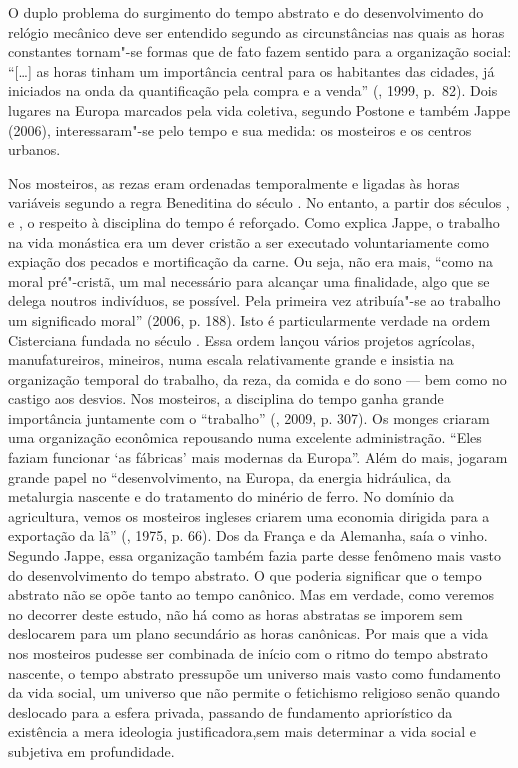 O duplo problema do surgimento do tempo abstrato e do desenvolvimento do
relógio mecânico deve ser entendido segundo as circunstâncias nas quais
as horas constantes tornam"-se formas que de fato fazem sentido para a
organização social: ``[\ldots{}] as horas tinham um importância
central para os habitantes das cidades, já iniciados na onda da
quantificação pela compra e a venda'' (, 1999, p.~82). Dois
lugares na Europa marcados pela vida coletiva, segundo Postone e também
Jappe (2006), interessaram"-se pelo tempo e sua medida: os mosteiros e os
centros urbanos.

Nos mosteiros, as rezas eram ordenadas temporalmente e ligadas às horas
variáveis segundo a regra Beneditina do século . No entanto, a partir
dos séculos ,  e , o respeito à disciplina do tempo é
reforçado. Como explica Jappe, o trabalho na vida monástica era um dever
cristão a ser executado voluntariamente como expiação dos pecados e
mortificação da carne. Ou seja, não era mais, ``como na moral
pré"-cristã, um mal necessário para alcançar uma finalidade, algo que se
delega noutros indivíduos, se possível. Pela primeira vez atribuía"-se ao
trabalho um significado moral'' (2006, p. 188). Isto é particularmente
verdade na ordem Cisterciana fundada no século . Essa ordem lançou
vários projetos agrícolas, manufatureiros, mineiros, numa escala
relativamente grande e insistia na organização temporal do trabalho, da
reza, da comida e do sono --- bem como no castigo aos desvios. Nos
mosteiros, a disciplina do tempo ganha grande importância juntamente com
o ``trabalho'' (, 2009, p. 307). Os monges criaram uma
organização econômica repousando numa excelente administração. ``Eles
faziam funcionar `as fábricas' mais modernas da Europa''. Além do mais,
jogaram grande papel no ``desenvolvimento, na Europa, da energia
hidráulica, da metalurgia nascente e do tratamento do minério de ferro.
No domínio da agricultura, vemos os mosteiros ingleses criarem uma
economia dirigida para a exportação da lã'' (, 1975, p. 66). Dos
da França e da Alemanha, saía o vinho. Segundo Jappe, essa organização
também fazia parte desse fenômeno mais vasto do desenvolvimento do tempo
abstrato. O que poderia significar que o tempo abstrato não se opõe
tanto ao tempo canônico. Mas em verdade, como veremos no decorrer deste
estudo, não há como as horas abstratas se imporem sem deslocarem para um
plano secundário as horas canônicas. Por mais que a vida nos mosteiros
pudesse ser combinada de início com o ritmo do tempo abstrato nascente, o tempo
abstrato pressupõe um universo mais vasto como fundamento da vida social,
um universo que não permite o fetichismo religioso senão quando
deslocado para a esfera privada, passando de fundamento apriorístico
da existência a mera ideologia justificadora,sem mais determinar a
vida social e subjetiva em profundidade.

